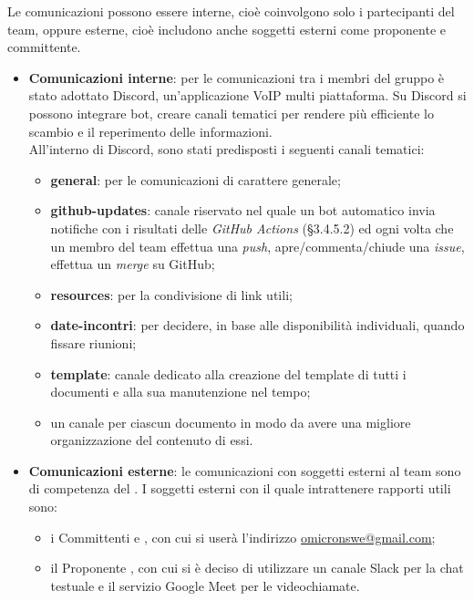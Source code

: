 Le comunicazioni possono essere interne, cioè coinvolgono solo i partecipanti del team, oppure esterne, cioè includono anche soggetti esterni come proponente e committente.
\begin{itemize}
	\item \textbf{Comunicazioni interne}: per le comunicazioni tra i membri del gruppo è stato adottato Discord, un'applicazione VoIP multi piattaforma. Su Discord si possono integrare bot, creare canali tematici per rendere più efficiente lo scambio e il reperimento delle informazioni. \\
	All'interno di Discord, sono stati predisposti i seguenti canali tematici:
	\begin{itemize}
	\item \textbf{general}: per le comunicazioni di carattere generale;
	\item \textbf{github-updates}: canale riservato nel quale un bot automatico invia notifiche con i risultati delle \textit{GitHub Actions} (§3.4.5.2) ed ogni volta che un membro del team effettua una \textit{push}, apre/commenta/chiude una \textit{issue}, effettua un \textit{merge} su GitHub;
	\item \textbf{resources}: per la condivisione di link utili;
	\item \textbf{date-incontri}: per decidere, in base alle disponibilità individuali, quando fissare riunioni;
	\item \textbf{template}: canale dedicato alla creazione del template di tutti i documenti e alla sua manutenzione nel tempo;
	\item un canale per ciascun documento in modo da avere una migliore organizzazione del contenuto di essi. 
	\end{itemize}
	\item \textbf{Comunicazioni esterne}: le comunicazioni con soggetti esterni al team sono di competenza del \respProg . I soggetti esterni con il quale intrattenere rapporti utili sono:
	\begin{itemize}
		\item i Committenti \textbf{\VT} e \textbf{\CR}, con cui si userà l'indirizzo \url{omicronswe@gmail.com};
		\item il Proponente \textbf{\Proponente}, con cui si è deciso di utilizzare un canale Slack per la chat testuale e il servizio Google Meet per le videochiamate.
	\end{itemize}
\end{itemize}

